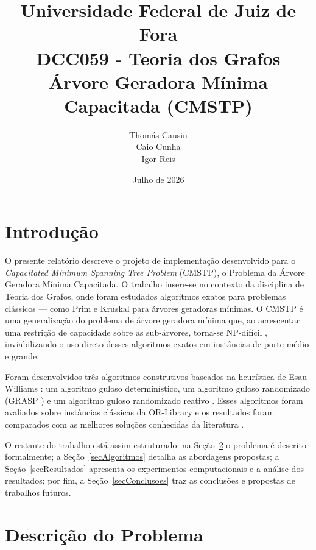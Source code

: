 \documentclass[12pt]{article}
\title{Universidade Federal de Juiz de Fora \\
        DCC059 - Teoria dos Grafos \\
        \vspace{6.0cm}
        {\Huge\textbf{Árvore Geradora Mínima\\
                      Capacitada (CMSTP)}}\\
        \vspace{6.0cm}
}
\author{
    Thomás Causin \\
    Caio Cunha \\
    Igor Reis \\
}
\date{Julho de 2026}
\begin{document}
\maketitle
\newpage

\tableofcontents
\newpage

\section{Introdução}

O presente relatório descreve o projeto de implementação desenvolvido para o \textit{Capacitated Minimum Spanning Tree Problem} (CMSTP), o Problema da Árvore Geradora Mínima Capacitada. O trabalho insere-se no contexto da disciplina de Teoria dos Grafos, onde foram estudados algoritmos exatos para problemas clássicos — como Prim e Kruskal para árvores geradoras mínimas. O CMSTP é uma generalização do problema de árvore geradora mínima que, ao acrescentar uma restrição de capacidade sobre as sub-árvores, torna-se NP-difícil \cite{garey1979}, inviabilizando o uso direto desses algoritmos exatos em instâncias de porte médio e grande.

Foram desenvolvidos três algoritmos construtivos baseados na heurística de Esau--Williams \cite{esauwilliams1966}: um algoritmo guloso determinístico, um algoritmo guloso randomizado (GRASP \cite{feo1995}) e um algoritmo guloso randomizado reativo \cite{prais2000}. Esses algoritmos foram avaliados sobre instâncias clássicas da OR-Library \cite{beasley1990} e os resultados foram comparados com as melhores soluções conhecidas da literatura \cite{ruiz2015}.

O restante do trabalho está assim estruturado: na Seção~\ref{secProblema} o problema é descrito formalmente; a Seção~\ref{secAlgoritmos} detalha as abordagens propostas; a Seção~\ref{secResultados} apresenta os experimentos computacionais e a análise dos resultados; por fim, a Seção~\ref{secConclusoes} traz as conclusões e propostas de trabalhos futuros.


\section{Descrição do Problema}
\label{secProblema}
\end{document}
